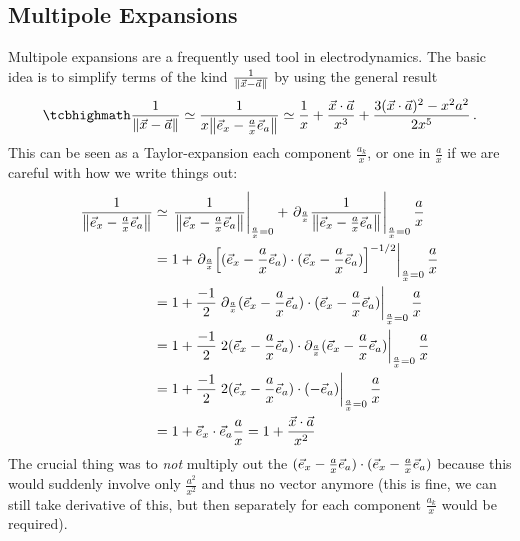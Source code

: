 \documentclass[../class_mech_main.tex]{subfiles}
\begin{document}
        \subsection{Multipole Expansions}
Multipole expansions are a frequently used tool in electrodynamics. The basic idea is to simplify terms of the kind $\frac{1}{\norm{\vec{x} - \vec{a}}}$ by using the general result
\begin{equation}\label{eq:multipole_exp_general}
    \eqbox{
        \frac{1}{\norm{\vec{x} - \vec{a}}}
        \simeq \frac{1}{x \norm{\vec{e}_x - \frac{a}{x} \vec{e}_a}}
        \simeq \frac{1}{x} + \frac{\vec{x} \cdot \vec{a}}{x^3} + \frac{3 (\vec{x} \cdot \vec{a})^2 - x^2 a^2}{2 x^5}
    } \, .
\end{equation}
This can be seen as a Taylor-expansion each component $\frac{a_k}{x}$, or one in $\frac{a}{x}$ if we are careful with how we write things out:
\begin{align*}
    \frac{1}{\norm{\unitvec{x} - \frac{a}{x} \unitvec{a}}} &\simeq \eval{\frac{1}{\norm{\unitvec{x} - \frac{a}{x} \unitvec{a}}}}_{\frac{a}{x} = 0} + \eval{\partial_{\frac{a}{x}} \frac{1}{\norm{\unitvec{x} - \frac{a}{x} \unitvec{a}}}}_{\frac{a}{x} = 0} \frac{a}{x}
    \\
    &= 1 + \eval{\partial_{\frac{a}{x}} \qty[(\unitvec{x} - \frac{a}{x} \unitvec{a}) \cdot (\unitvec{x} - \frac{a}{x} \unitvec{a})]^{-1/2}}_{\frac{a}{x} = 0} \frac{a}{x}
    \\
    &= 1 + \frac{-1}{2} \eval{\partial_{\frac{a}{x}} (\unitvec{x} - \frac{a}{x} \unitvec{a}) \cdot (\unitvec{x} - \frac{a}{x} \unitvec{a})}_{\frac{a}{x} = 0} \frac{a}{x}
    \\
    &= 1 + \frac{-1}{2} \eval{2 (\unitvec{x} - \frac{a}{x} \unitvec{a}) \cdot \partial_{\frac{a}{x}} (\unitvec{x} - \frac{a}{x} \unitvec{a})}_{\frac{a}{x} = 0} \frac{a}{x}
    \\
    &= 1 + \frac{-1}{2} \eval{2 (\unitvec{x} - \frac{a}{x} \unitvec{a}) \cdot (- \unitvec{a})}_{\frac{a}{x} = 0} \frac{a}{x}
    \\
    &= 1 + \unitvec{x} \cdot \unitvec{a} \frac{a}{x} = 1 + \frac{\vec{x} \cdot \vec{a}}{x^2}
\end{align*}
The crucial thing was to \emph{not} multiply out the $(\vec{e}_{x} - \frac{a}{x} \vec{e}_{a}) \cdot (\vec{e}_{x} - \frac{a}{x} \vec{e}_{a})$ because this would suddenly involve only $\frac{a^2}{x^2}$ and thus no vector anymore (this is fine, we can still take derivative of this, but then separately for each component $\frac{a_k}{x}$ would be required).
\end{document}
